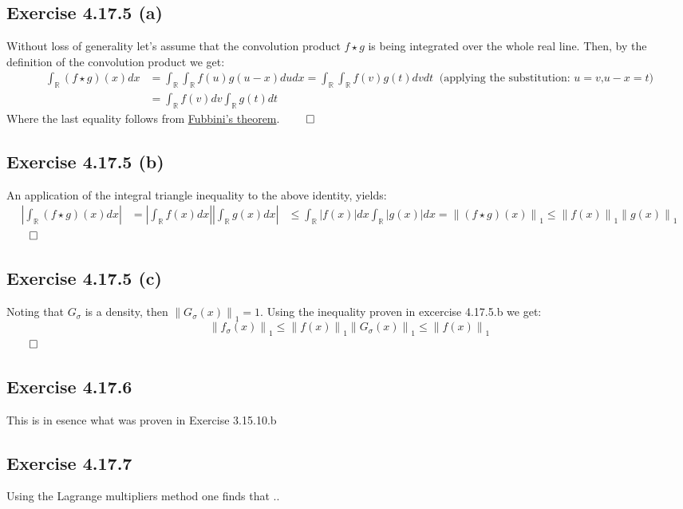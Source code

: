 \documentclass{exam}
\renewenvironment{proof}{{\noindent\itshape\ignorespaces}}{{\hfill$\qed$\\}}
\begin{document}
\subsection*{Exercise 4.17.5 (a)}
\begin{proof}
    Without loss of generality let's assume that the convolution product $f \star g$ is being integrated over the whole real line. Then, by the definition of the 
    convolution product we get:\\
    \begin{equation*}
        \begin{aligned}
            \int_{\mathbb{R}} (f \star g) (x) d x  &= \displaystyle \int_{\mathbb{R}} \int_{\mathbb{R}} f(u) g(u-x) du dx = \displaystyle \int_{\mathbb{R}} \int_{\mathbb{R}} f(v) g(t) dv dt   \ \text{ (applying the substitution: } u = v \text{,}  u- x = t \text{)}\\
            &= \int_{\mathbb{R}} f(v) d v \displaystyle \int_{\mathbb{R}} g(t) dt
        \end{aligned}    
    \end{equation*}
\noindent Where the last equality follows from \href{https://en.wikipedia.org/wiki/Fubini%27s_theorem}{Fubbini's theorem}.
\end{proof}

\subsection*{Exercise 4.17.5 (b)}
\begin{proof}
    An application of the integral triangle inequality to the above identity, yields:
    \begin{equation*}
        \begin{aligned}
        \left| \int_{\mathbb{R}} (f \star g) (x) d x  \right| &= \left| \int_{\mathbb{R}} f (x) d x  \right| \left| \int_{\mathbb{R}} g (x) d x  \right|
        &\leq \int_{\mathbb{R}} \left|  f (x) \right| d x  \int_{\mathbb{R}} \left|  g (x) \right| d x = {\lVert (f\star g )(x) \lVert}_{1} \leq {\lVert f(x) \lVert}_{1}{\lVert g(x) \lVert}_{1}
        \end{aligned}    
    \end{equation*} 
\end{proof}
\subsection*{Exercise 4.17.5 (c)}
\begin{proof}
    \noindent Noting that $G_{\sigma}$ is a density, then ${\lVert G_{\sigma}(x) \lVert}_{1} = 1$. Using the inequality proven in excercise 4.17.5.b we get:\\
    \begin{equation*}
        {\lVert f_{\sigma}(x) \lVert}_{1} \leq {\lVert f(x) \lVert}_{1}{\lVert G_{\sigma}(x) \lVert}_{1} \leq {\lVert f(x) \lVert}_{1} 
    \end{equation*}
\end{proof}    

\subsection*{Exercise 4.17.6}
This is in esence what was proven in Exercise 3.15.10.b  

\subsection*{Exercise 4.17.7}
Using the Lagrange multipliers method one finds that ..
\end{document}
